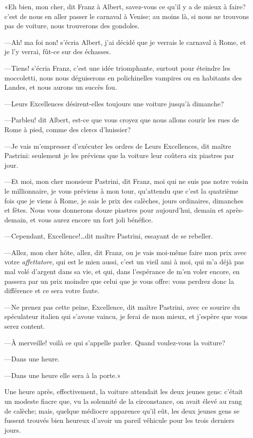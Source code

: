 «Eh bien, mon cher, dit Franz à Albert, savez-vous ce qu'il y a de mieux à faire? c'est de nous en aller passer le carnaval à Venise; au moins là, si nous ne trouvons pas de voiture, nous trouverons des gondoles. 

—Ah! ma foi non! s'écria Albert, j'ai décidé que je verrais le carnaval à Rome, et je l'y verrai, fût-ce sur des échasses. 

—Tiens! s'écria Franz, c'est une idée triomphante, surtout pour éteindre les moccoletti, nous nous déguiserons en polichinelles vampires ou en habitants des Landes, et nous aurons un succès fou. 

—Leurs Excellences désirent-elles toujours une voiture jusqu'à dimanche? 

—Parbleu! dit Albert, est-ce que vous croyez que nous allons courir les rues de Rome à pied, comme des clercs d'huissier? 

—Je vais m'empresser d'exécuter les ordres de Leurs Excellences, dit maître Pastrini: seulement je les préviens que la voiture leur coûtera six piastres par jour. 

—Et moi, mon cher monsieur Pastrini, dit Franz, moi qui ne suis pas notre voisin le millionnaire, je vous préviens à mon tour, qu'attendu que c'est la quatrième fois que je viens à Rome, je sais le prix des calèches, jours ordinaires, dimanches et fêtes. Nous vous donnerons douze piastres pour aujourd'hui, demain et après-demain, et vous aurez encore un fort joli bénéfice. 

—Cependant, Excellence!\dots dit maître Pastrini, essayant de se rebeller. 

—Allez, mon cher hôte, allez, dit Franz, ou je vais moi-même faire mon prix avec votre \textit{affettatore}, qui est le mien aussi, c'est un vieil ami à moi, qui m'a déjà pas mal volé d'argent dans sa vie, et qui, dans l'espérance de m'en voler encore, en passera par un prix moindre que celui que je vous offre: vous perdrez donc la différence et ce sera votre faute. 

—Ne prenez pas cette peine, Excellence, dit maître Pastrini, avec ce sourire du spéculateur italien qui s'avoue vaincu, je ferai de mon mieux, et j'espère que vous serez content. 

—À merveille! voilà ce qui s'appelle parler. Quand voulez-vous la voiture? 

—Dans une heure. 

—Dans une heure elle sera à la porte.» 

Une heure après, effectivement, la voiture attendait les deux jeunes gens: c'était un modeste fiacre que, vu la solennité de la circonstance, on avait élevé au rang de calèche; mais, quelque médiocre apparence qu'il eût, les deux jeunes gens se fussent trouvés bien heureux d'avoir un pareil véhicule pour les trois derniers jours. 

